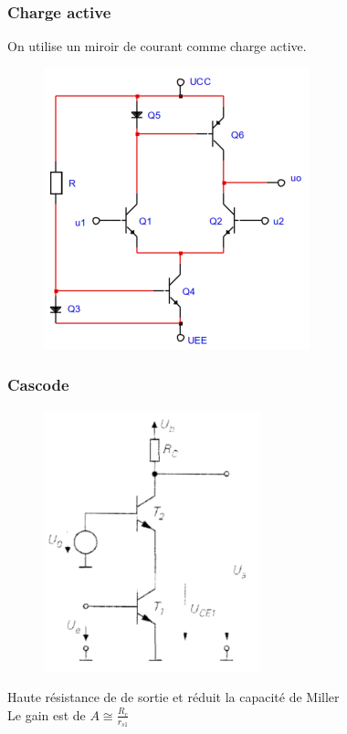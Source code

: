 \documentclass[resume]{subfiles}
\begin{document}
\begin{multicols}{3}
\subsubsection{Charge active}
On utilise un miroir de courant comme charge active.
\begin{figure}[H]
    \centering
    \includegraphics[width=0.5\columnwidth]{../images/OpAmp1/m_chrgact.png}
\end{figure}

\subsubsection{Cascode}
\begin{figure}[H]
    \centering
    \includegraphics[width=0.5\columnwidth]{../images/OpAmp1/m_cascode.png}
\end{figure}
Haute résistance de de sortie et réduit la capacité de Miller\\
Le gain est de $ A \cong \frac{R_c}{r_{s1}}$


\end{multicols}
\end{document}
